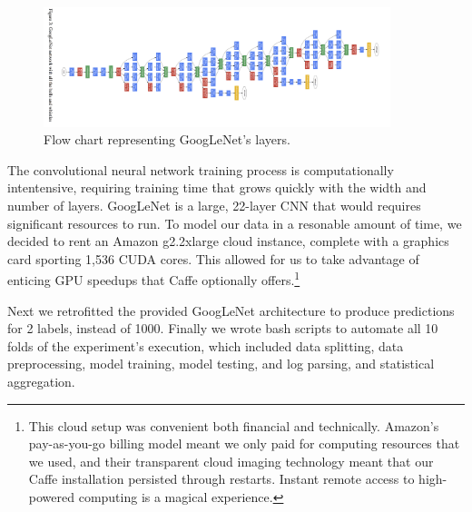 \documentclass[midd]{thesis}
\begin{document}
\begin{figure}[h]
\centering
\includegraphics[width=0.9\textwidth]{figures/googlenet.png}
\caption{Flow chart representing GoogLeNet's layers.}
\label{fig:googlenet}
\end{figure}

The convolutional neural network training process is computationally intentensive, requiring training time that grows quickly with the width and number of layers. GoogLeNet is a large, 22-layer CNN that would requires significant resources to run. To model our data in a resonable amount of time, we decided to rent an Amazon g2.2xlarge cloud instance, complete with a graphics card sporting 1,536 CUDA cores. This allowed for us to take advantage of enticing GPU speedups that Caffe optionally offers.\footnote{This cloud setup was convenient both financial and technically. Amazon's pay-as-you-go billing model meant we only paid for computing resources that we used, and their transparent cloud imaging technology meant that our Caffe installation persisted through restarts. Instant remote access to high-powered computing is a magical experience.}

Next we retrofitted the provided GoogLeNet architecture to produce predictions for 2 labels, instead of 1000. Finally we wrote bash scripts to automate all 10 folds of the experiment's execution, which included data splitting, data preprocessing, model training, model testing, and log parsing, and statistical aggregation.
\end{document}
